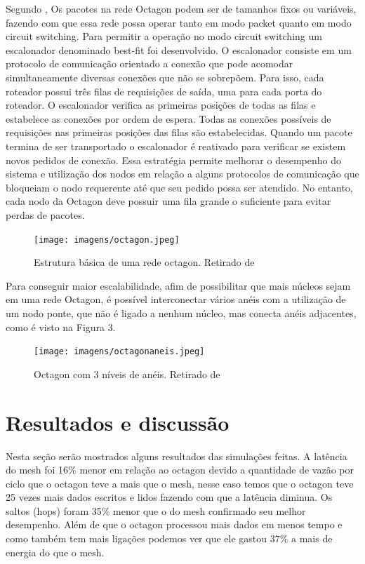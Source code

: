 \documentclass[12pt]{article}
\begin{document}
Segundo \cite{junior2010analise}, Os pacotes na rede Octagon podem ser de tamanhos fixos ou variáveis, fazendo com que essa rede possa operar tanto em modo packet quanto em modo circuit switching. Para permitir a operação no modo circuit switching um escalonador denominado best-fit foi desenvolvido. O escalonador
consiste em um protocolo de comunicação orientado a conexão que pode acomodar
simultaneamente diversas conexões que não se sobrepõem. Para isso, cada roteador possui
três filas de requisições de saída, uma para cada porta do roteador. O escalonador verifica as
primeiras posições de todas as filas e estabelece as conexões por ordem de espera. Todas as
conexões possíveis de requisições nas primeiras posições das filas são estabelecidas. Quando
um pacote termina de ser transportado o escalonador é reativado para verificar se existem
novos pedidos de conexão. Essa estratégia permite melhorar o desempenho do sistema e
utilização dos nodos em relação a alguns protocolos de comunicação que bloqueiam o nodo
requerente até que seu pedido possa ser atendido. No entanto, cada nodo da Octagon deve
possuir uma fila grande o suficiente para evitar perdas de pacotes. 

\begin{figure}[H]
\centering
\texttt{[image: imagens/octagon.jpeg]}
\label{octagonbasico}
\caption{Estrutura básica de uma rede octagon. Retirado de \cite{liu2015topology}}
\end{figure}


Para conseguir maior escalabilidade, afim de possibilitar que mais núcleos sejam  em uma rede Octagon, é possível interconectar vários anéis com a utilização de um nodo ponte, que não é ligado a nenhum núcleo, mas conecta anéis adjacentes, como é visto na Figura 3.

\begin{figure}[H]
\centering
\texttt{[image: imagens/octagonaneis.jpeg]}
\label{octagon3}
\caption{Octagon com 3 níveis de anéis. Retirado de \cite{junior2010analise}}
\end{figure}

\section{Resultados e discussão} \label{sec:ava}
Nesta seção serão mostrados alguns resultados das simulações feitas. A latência do mesh foi 16\% menor em relação ao octagon devido a quantidade de vazão por ciclo que o octagon teve a mais que o mesh, nesse caso temos que o octagon teve 25 vezes mais dados escritos e lidos fazendo com que a latência diminua. Os saltos (hops) foram 35\% menor que o do mesh confirmado seu melhor desempenho. Além de que o octagon processou mais dados em menos tempo e como também tem mais ligações podemos ver que ele gastou 37\% a mais de energia do que o mesh.
\end{document}
